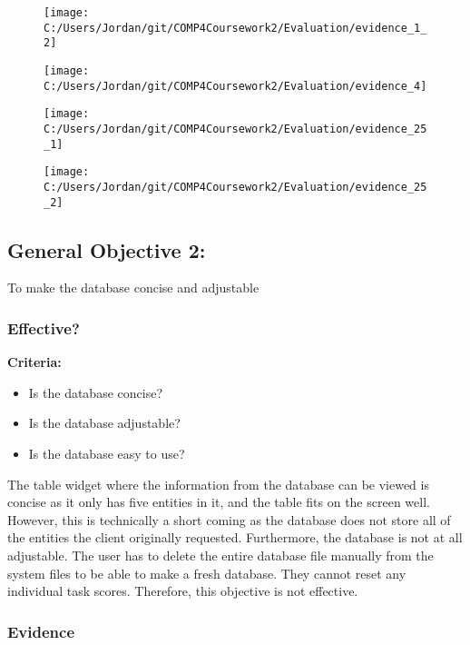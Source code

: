 \begin{figure}[H]
	\texttt{[image: C:/Users/Jordan/git/COMP4Coursework2/Evaluation/evidence\_1\_2]}
\end{figure}

\begin{figure}[H]
	\texttt{[image: C:/Users/Jordan/git/COMP4Coursework2/Evaluation/evidence\_4]}
\end{figure}

\begin{figure}[H]
	\texttt{[image: C:/Users/Jordan/git/COMP4Coursework2/Evaluation/evidence\_25\_1]}
\end{figure}

\begin{figure}[H]
	\texttt{[image: C:/Users/Jordan/git/COMP4Coursework2/Evaluation/evidence\_25\_2]}
\end{figure}

\subsection{General Objective 2: }

To make the database concise and adjustable

\subsubsection{Effective?}

\textbf{Criteria: }

\begin{itemize}
	\item Is the database concise?
	\item Is the database adjustable?
	\item Is the database easy to use?
\end{itemize}

The table widget where the information from the database can be viewed is concise as it only has five entities in it, and the table fits on the screen well. However, this is technically a short coming as the database does not store all of the entities the client originally requested. Furthermore, the database is not at all adjustable. The user has to delete the entire database file manually from the system files to be able to make a fresh database. They cannot reset any individual task scores. Therefore, this objective is not effective.

\subsubsection{Evidence}

